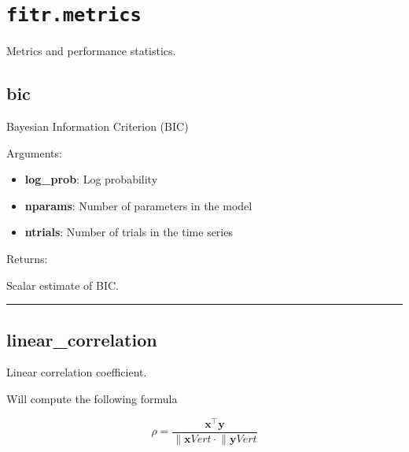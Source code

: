 \section{\texorpdfstring{\texttt{fitr.metrics}}{fitr.metrics}}\label{fitr.metrics}

Metrics and performance statistics.

\subsection{bic}\label{bic}

\begin{Shaded}
\begin{Highlighting}[]
\end{Highlighting}
\end{Shaded}

Bayesian Information Criterion (BIC)

Arguments:

\begin{itemize}
\tightlist
\item
  \textbf{log\_prob}: Log probability
\item
  \textbf{nparams}: Number of parameters in the model
\item
  \textbf{ntrials}: Number of trials in the time series
\end{itemize}

Returns:

Scalar estimate of BIC.

\begin{center}\rule{0.5\linewidth}{\linethickness}\end{center}

\subsection{linear\_correlation}\label{linear_correlation}

\begin{Shaded}
\begin{Highlighting}[]
\end{Highlighting}
\end{Shaded}

Linear correlation coefficient.

Will compute the following formula

\[
\rho = \frac{\mathbf x^\top \mathbf y}{\lVert \mathbf x 
Vert \cdot \lVert \mathbf y 
Vert}
\]

